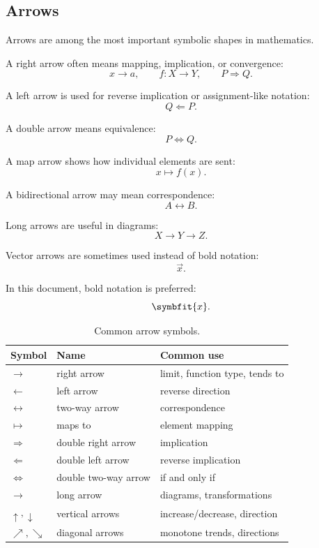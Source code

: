 \documentclass[11pt,twocolumn]{article}
\newcommand{\vct}[1]{\symbfit{#1}}   %
\begin{document}
\subsection{Arrows}

Arrows are among the most important symbolic shapes in mathematics.

A right arrow often means mapping, implication, or convergence:
\[
x \to a,
\qquad
f:X\to Y,
\qquad
P\Rightarrow Q.
\]

A left arrow is used for reverse implication or assignment-like notation:
\[
Q \Leftarrow P.
\]

A double arrow means equivalence:
\[
P \Leftrightarrow Q.
\]

A map arrow shows how individual elements are sent:
\[
x \mapsto f(x).
\]

A bidirectional arrow may mean correspondence:
\[
A \leftrightarrow B.
\]

Long arrows are useful in diagrams:
\[
X \longrightarrow Y \longrightarrow Z.
\]

Vector arrows are sometimes used instead of bold notation:
\[
\vec{x}.
\]

In this document, bold notation is preferred:
\[
\vct{x}.
\]

\begin{table}[ht]
\centering
\small
\caption{Common arrow symbols.}
\begin{tabular}{lll}
\toprule
Symbol & Name & Common use \\
\midrule
$\to$ & right arrow & limit, function type, tends to \\
$\leftarrow$ & left arrow & reverse direction \\
$\leftrightarrow$ & two-way arrow & correspondence \\
$\mapsto$ & maps to & element mapping \\
$\Rightarrow$ & double right arrow & implication \\
$\Leftarrow$ & double left arrow & reverse implication \\
$\Leftrightarrow$ & double two-way arrow & if and only if \\
$\longrightarrow$ & long arrow & diagrams, transformations \\
$\uparrow,\downarrow$ & vertical arrows & increase/decrease, direction \\
$\nearrow,\searrow$ & diagonal arrows & monotone trends, directions \\
\bottomrule
\end{tabular}
\end{table}
\end{document}
